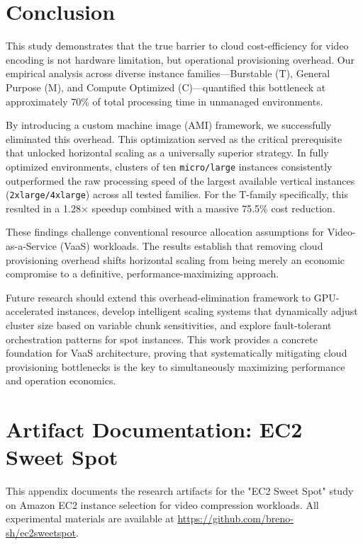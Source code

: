 \documentclass[conference]{IEEEtran}
\begin{document}
\section{Conclusion}
\label{conclusion}

This study demonstrates that the true barrier to cloud cost-efficiency for video encoding is not hardware limitation, but operational provisioning overhead. Our empirical analysis across diverse instance families—Burstable (T), General Purpose (M), and Compute Optimized (C)—quantified this bottleneck at approximately 70\% of total processing time in unmanaged environments.
 
By introducing a custom machine image (AMI) framework, we successfully eliminated this overhead. This optimization served as the critical prerequisite that unlocked horizontal scaling as a universally superior strategy. In fully optimized environments, clusters of ten \texttt{micro/large} instances consistently outperformed the raw processing speed of the largest available vertical instances (\texttt{2xlarge/4xlarge}) across all tested families. For the T-family specifically, this resulted in a 1.28× speedup combined with a massive 75.5\% cost reduction.

These findings challenge conventional resource allocation assumptions for Video-as-a-Service (VaaS) workloads. The results establish that removing cloud provisioning overhead shifts horizontal scaling from being merely an economic compromise to a definitive, performance-maximizing approach.

Future research should extend this overhead-elimination framework to GPU-accelerated instances, develop intelligent scaling systems that dynamically adjust cluster size based on variable chunk sensitivities, and explore fault-tolerant orchestration patterns for spot instances. This work provides a concrete foundation for VaaS architecture, proving that systematically mitigating cloud provisioning bottlenecks is the key to simultaneously maximizing performance and operation economics.


\appendices
\section{Artifact Documentation: EC2 Sweet Spot}
\label{app:artifact}

This appendix documents the research artifacts for the "EC2 Sweet Spot" study on Amazon EC2 instance selection for video compression workloads. All experimental materials are available at \url{https://github.com/breno-sh/ec2sweetspot}.
\end{document}
